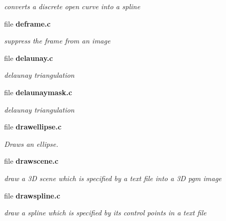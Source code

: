 \begin{DoxyCompactItemize}
\begin{DoxyCompactList}\small\item\em converts a discrete open curve into a spline \item\end{DoxyCompactList}

\item 
file {\bf deframe.c}


\begin{DoxyCompactList}\small\item\em suppress the frame from an image \item\end{DoxyCompactList}

\item 
file {\bf delaunay.c}


\begin{DoxyCompactList}\small\item\em delaunay triangulation \item\end{DoxyCompactList}

\item 
file {\bf delaunaymask.c}


\begin{DoxyCompactList}\small\item\em delaunay triangulation \item\end{DoxyCompactList}

\item 
file {\bf drawellipse.c}


\begin{DoxyCompactList}\small\item\em Draws an ellipse. \item\end{DoxyCompactList}

\item 
file {\bf drawscene.c}


\begin{DoxyCompactList}\small\item\em draw a 3D scene which is specified by a text file into a 3D pgm image \item\end{DoxyCompactList}

\item 
file {\bf drawspline.c}


\begin{DoxyCompactList}\small\item\em draw a spline which is specified by its control points in a text file \item\end{DoxyCompactList}


\end{DoxyCompactItemize}
